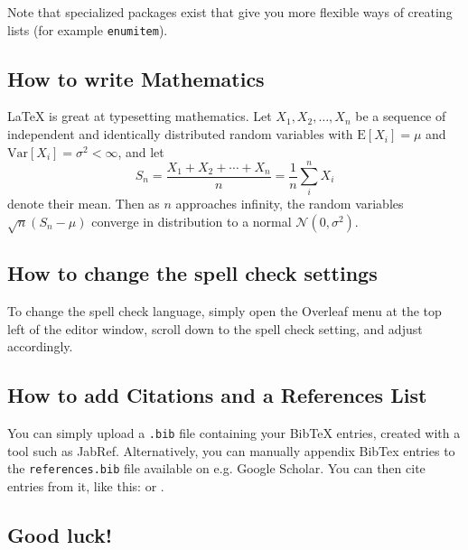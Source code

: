 \documentclass[12pt,a4paper,faculty=ea,language=en,doctype=article]{ugent-doc}
\begin{document}
Note that specialized packages exist that give you more flexible ways of creating lists (for example \verb|enumitem|).


\subsection{How to write Mathematics}

\LaTeX{} is great at typesetting mathematics.
Let $X_1, X_2, \ldots, X_n$ be a sequence of independent and identically distributed random variables with $\text{E}[X_i] = \mu$ and $\text{Var}[X_i] = \sigma^2 < \infty$, and let
\[S_n = \frac{X_1 + X_2 + \cdots + X_n}{n}
	= \frac{1}{n}\sum_{i}^{n} X_i\]
denote their mean.
Then as $n$ approaches infinity, the random variables $\sqrt{n}(S_n - \mu)$ converge in distribution to a normal $\mathcal{N}(0, \sigma^2)$.


\subsection{How to change the spell check settings}

To change the spell check language, simply open the Overleaf menu at the top left of the editor window, scroll down to the spell check setting, and adjust accordingly.


\subsection{How to add Citations and a References List}

You can simply upload a \texttt{.bib} file containing your BibTeX entries, created with a tool such as JabRef.
Alternatively, you can manually appendix BibTex entries to the \texttt{references.bib} file available on e.g. Google Scholar. You can then cite entries from it, like this: \textcite{greenwade93} or \parencite{greenwade93}.


\subsection{Good luck!}
\end{document}
